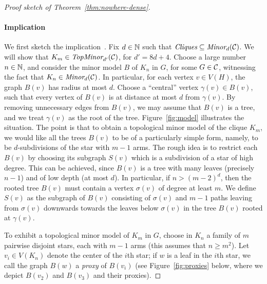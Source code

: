 \begin{proof}[Proof sketch of Theorem~\ref{thm:nowhere-dense}]
  \paragraph{Implication~} 
  We first sketch the implication~.
  Fix $d\in\mathbb{N}$ such that $\textit{Cliques}\subseteq\textit{Minor}_{d}({\cal C})$.
  We will show that $K_m\in\textit{TopMinor}_{d'}({\cal C})$, for $d'=8d+4$.
  Choose a large number $n\in\mathbb{N}$,
  and consider the minor model $B$ of $K_n$ in $G$,
  for some $G\in {\cal C}$, witnessing the fact that $K_n\in \textit{Minor}_{d}({\cal C})$. In particular, for each vertex $v\in V(H)$,
  the graph $B(v)$ has radius at most $d$.
  Choose a ``central'' vertex $\gamma(v)\in B(v)$, 
  such that every vertex of $B(v)$ is at distance at most $d$ from $\gamma(v)$. By removing unnecessary edges from $B(v)$, we may assume that $B(v)$ is a tree, and we treat $\gamma(v)$ as the root of the tree. Figure~\ref{fig:model}
  illustrates the situation. The point is that to obtain a topological minor model of the clique $K_m$, we would like all the trees $B(v)$ to 
  be of a particularly simple form, namely, to be $d$-subdivisions of the star with $m-1$ arms. The rough idea is to restrict each $B(v)$ by choosing its subgraph $S(v)$ which is a subdivision of a star of high degree. This can be achieved, since $B(v)$ is a tree with many leaves (precisely $n-1$) and of low depth (at most $d$). In particular, if $n>(m-2)^d$, then the rooted tree $B(v)$ must contain a vertex $\sigma(v)$ of degree at least $m$.   
   We define $S(v)$ 
  as the subgraph of $B(v)$ consisting of $\sigma(v)$
  and $m-1$ paths leaving from $\sigma(v)$ downwards towards the leaves below $\sigma(v)$ in the tree $B(v)$ rooted at $\gamma(v)$. 
  
To exhibit a topological minor model of $K_m$ in $G$,
choose in $K_n$ a family of $m$ pairwise disjoint stars, each with $m-1$ arms
(this assumes that $n\ge m^2$). 
Let $v_i\in V(K_n)$ denote the center of the $i$th star;
if $w$ is a leaf in the $i$th star, we call the graph $B(w)$
a \emph{proxy} of $B(v_i)$ (see Figure~\ref{fig:proxies} below, where  we depict $B(v_2)$ and $B(v_3)$ and their proxies). 



\end{proof}
